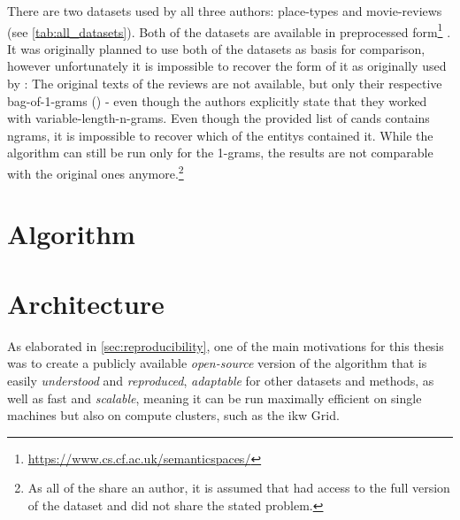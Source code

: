 There are two datasets used by all three authors: place-types and movie-reviews (see \autoref{tab:all_datasets}). Both of the datasets are available in preprocessed form\footnote{\url{https://www.cs.cf.ac.uk/semanticspaces/}} \cite{Derrac2015}. It was originally planned to use both of the datasets as basis for comparison, however unfortunately it is impossible to recover the form of it as originally used by \textcite{Derrac2015}: The original texts of the reviews are not available, but only their respective bag-of-1-grams () - even though the authors explicitly state that they worked with variable-length-n-grams. Even though the provided list of \glspl{cand} contains \glspl{ngram}, it is impossible to recover which of the \glspl{entity} contained it. While the algorithm can still be run only for the 1-grams, the results are not comparable with the original ones anymore.\footnote{As all of the \mainalgos share an author, it is assumed that \cite{Alshaikh2020,Ager2018} had access to the full version of the dataset and did not share the stated problem.}



\section{Algorithm}




\section{Architecture}
\label{sec:architecture}

As elaborated in \autoref{sec:reproducibility}, one of the main motivations for this thesis was to create a publicly available \textit{open-source} version of the algorithm that is easily \textit{understood} and \textit{reproduced}, \textit{adaptable} for other datasets and methods, as well as fast and \textit{scalable}, meaning it can be run maximally efficient on single machines but also on compute clusters, such as the \acrshort{ikw} Grid.


